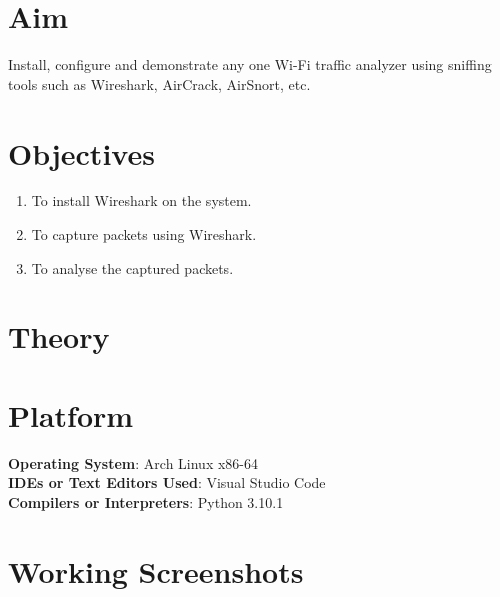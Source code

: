 \documentclass[11pt]{article}
\begin{document}
\tableofcontents
\thispagestyle{empty}
\clearpage

\setcounter{page}{1}

\section{Aim}
Install, configure and demonstrate any one Wi-Fi traffic analyzer using sniffing tools such as
Wireshark, AirCrack, AirSnort, etc.

\section{Objectives}
\begin{enumerate}
    \item To install Wireshark on the system.
    \item To capture packets using Wireshark.
    \item To analyse the captured packets.
\end{enumerate}

\section{Theory}

\section{Platform}
\textbf{Operating System}: Arch Linux x86-64 \\
\textbf{IDEs or Text Editors Used}: Visual Studio Code\\
\textbf{Compilers or Interpreters}: Python 3.10.1\\

\section{Working Screenshots}
\end{document}
